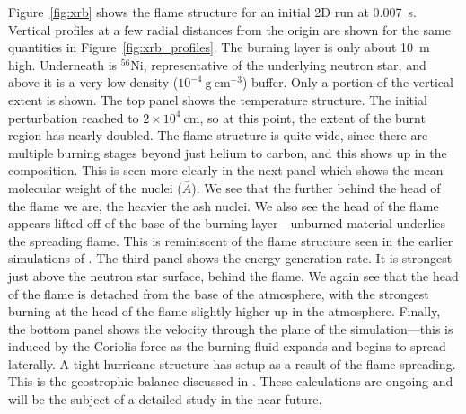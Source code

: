 \documentclass[a4paper]{jpconf}
\newcommand{\isot}[2]{$^{#2}\mathrm{#1}$}
\newcommand{\gcc}{\mathrm{g~cm^{-3} }}
\begin{document}
Figure~\ref{fig:xrb} shows the flame structure for an initial 2D run
at 0.007~s.  Vertical profiles at a few radial distances from the
origin are shown for the same quantities in
Figure~\ref{fig:xrb_profiles}.  The burning layer is only about 10~m
high.  Underneath is \isot{Ni}{56}, representative of the underlying
neutron star, and above it is a very low density ($10^{-4}~\gcc$)
buffer.  Only a portion of the vertical extent is shown.  The top
panel shows the temperature structure.  The initial perturbation
reached to $2\times 10^4~\mathrm{cm}$, so at this point, the extent of
the burnt region has nearly doubled.  The flame structure is quite
wide, since there are multiple burning stages beyond just helium to
carbon, and this shows up in the composition.  This is seen more
clearly in the next panel which shows the mean molecular weight of the
nuclei ($\bar{A}$).  We see that the further behind the head of the
flame we are, the heavier the ash nuclei.  We also see the head of the
flame appears lifted off of the base of the burning layer---unburned
material underlies the spreading flame.  This is reminiscent of the
flame structure seen in the earlier simulations of
\cite{cavecchi:2012}.  The third panel shows the energy generation
rate.  It is strongest just above the neutron star surface, behind the
flame.  We again see that the head of the flame is detached from the
base of the atmosphere, with the strongest burning at the head of the
flame slightly higher up in the atmosphere.  Finally, the bottom panel
shows the velocity through the plane of the simulation---this is
induced by the Coriolis force as the burning fluid expands and begins
to spread laterally.  A tight hurricane structure has setup as a
result of the flame spreading.  This is the geostrophic balance
discussed in \cite{SPIT_ETAL02}.  These calculations are ongoing and
will be the subject of a detailed study in the near future.
\end{document}
